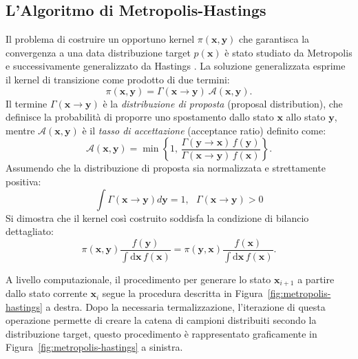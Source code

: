 \subsection{L'Algoritmo di Metropolis-Hastings}
\label{subsec:metropolis}
Il problema di costruire un opportuno kernel $\pi(\mathbf{x}, \mathbf{y})$ che garantisca la convergenza a una data distribuzione target $p(\mathbf{x})$ è stato studiato da Metropolis \cite{metropolis1953equation}  e successivamente generalizzato da Hastings \cite{hastings1970monte}. La soluzione generalizzata esprime il kernel di transizione come prodotto di due termini:
\begin{equation}
\pi(\mathbf{x}, \mathbf{y}) = \Gamma(\mathbf{x} \to \mathbf{y}) \ \mathcal{A}(\mathbf{x}, \mathbf{y}).
\end{equation} Il termine $\Gamma(\mathbf{x} \to \mathbf{y})$ è la \emph{distribuzione di proposta} (proposal distribution), che definisce la probabilità di proporre uno spostamento dallo stato $\mathbf{x}$ allo stato $\mathbf{y}$, mentre $\mathcal{A}(\mathbf{x}, \mathbf{y})$ è il \emph{tasso di accettazione} (acceptance ratio) definito come:
\begin{equation}
    \mathcal{A}(\mathbf{x}, \mathbf{y}) = \min \left\{ 1, \, \frac{\Gamma(\mathbf{y} \to \mathbf{x}) \, f(\mathbf{y})}{\Gamma(\mathbf{x} \to \mathbf{y}) \, f(\mathbf{x})} \right\}.
\end{equation} Assumendo che la distribuzione di proposta sia normalizzata e strettamente positiva:
\begin{equation}
    \int \Gamma(\mathbf{x} \to \mathbf{y})d\mathbf{y} = 1,\ \ \ \Gamma(\mathbf{x} \to \mathbf{y}) > 0
\end{equation}
Si dimostra che il kernel così costruito soddisfa la condizione di bilancio dettagliato:
\begin{equation}
\pi(\mathbf{x}, \mathbf{y}) \frac{f(\mathbf{y})}{\int \mathrm{d}\mathbf{x} \, f(\mathbf{x})} = \pi(\mathbf{y}, \mathbf{x}) \frac{f(\mathbf{x})}{\int \mathrm{d}\mathbf{x} \, f(\mathbf{x})}.
\end{equation}

A livello computazionale, il procedimento per generare lo stato $\mathbf{x}_{i+1}$ a partire dallo stato corrente $\mathbf{x}_i$ segue la procedura descritta in Figura~\ref{fig:metropolis-hastings} a destra. Dopo la necessaria termalizzazione, l'iterazione di questa operazione permette di creare la catena di campioni distribuiti secondo la distribuzione target, questo procedimento è rappresentato graficamente in Figura~\ref{fig:metropolis-hastings} a sinistra.

